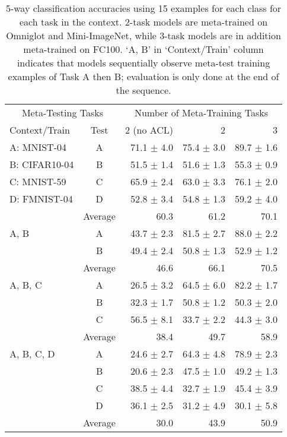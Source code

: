 \documentclass{article}
\begin{document}
\begin{table}[th]
\small
\caption{5-way classification accuracies using 15 examples for each class for each task in the context. 2-task models are meta-trained on Omniglot and Mini-ImageNet, while 3-task models are in addition meta-trained on FC100. `A, B' in `Context/Train' column indicates that models sequentially observe meta-test training examples of Task A then B; evaluation is only done at the end of the sequence.}
\vspace{-2mm}
\label{tab:more_task_acl}
\begin{center}
\begin{tabular}{lcrrr}
\toprule
 \multicolumn{2}{c}{Meta-Testing Tasks}  & \multicolumn{3}{c}{Number of Meta-Training Tasks} \\ \cmidrule(lr){1-2} \cmidrule(lr){3-5}
Context/Train & Test & 2 (no ACL) & 2 & 3 \\ \midrule
A: MNIST-04 & A & 71.1 $\pm$ 4.0 & 75.4 $\pm$ 3.0 & 89.7 $\pm$ 1.6 \\
B: CIFAR10-04 & B & 51.5 $\pm$ 1.4 & 51.6 $\pm$ 1.3 & 55.3 $\pm$ 0.9 \\
C: MNIST-59 & C & 65.9 $\pm$ 2.4 & 63.0 $\pm$ 3.3 & 76.1 $\pm$ 2.0 \\
D: FMNIST-04 & D & 52.8 $\pm$ 3.4 & 54.8 $\pm$ 1.3 & 59.2 $\pm$ 4.0 \\ 
 & Average & 60.3 & 61.2 & 70.1 \\ 
\midrule
A, B & A & 43.7 $\pm$ 2.3 & 81.5 $\pm$ 2.7 & 88.0 $\pm$ 2.2 \\ 
     & B &  49.4 $\pm$ 2.4 & 50.8 $\pm$ 1.3 & 52.9 $\pm$ 1.2 \\ 
     &  Average & 46.6 & 66.1 & 70.5 \\ \midrule
A, B, C & A & 26.5 $\pm$ 3.2 & 64.5 $\pm$ 6.0 & 82.2 $\pm$ 1.7 \\ 
 & B & 32.3 $\pm$ 1.7 & 50.8 $\pm$ 1.2 & 50.3 $\pm$ 2.0 \\ 
 & C & 56.5 $\pm$ 8.1 & 33.7 $\pm$ 2.2 & 44.3 $\pm$ 3.0 \\ 
 & Average & 38.4 & 49.7 & 58.9 \\ \midrule
A, B, C, D & A & 24.6 $\pm$ 2.7 & 64.3 $\pm$ 4.8 & 78.9 $\pm$ 2.3 \\ 
 & B & 20.6 $\pm$ 2.3 & 47.5 $\pm$ 1.0 & 49.2 $\pm$ 1.3 \\ 
 & C & 38.5 $\pm$  4.4 & 32.7 $\pm$ 1.9 & 45.4 $\pm$ 3.9 \\
 & D & 36.1 $\pm$ 2.5 & 31.2 $\pm$ 4.9 & 30.1 $\pm$ 5.8 \\  
 & Average & 30.0 & 43.9 & 50.9 \\ 
\bottomrule
\end{tabular}

\end{center}
\vspace{-3mm}
\end{table}
\end{document}
